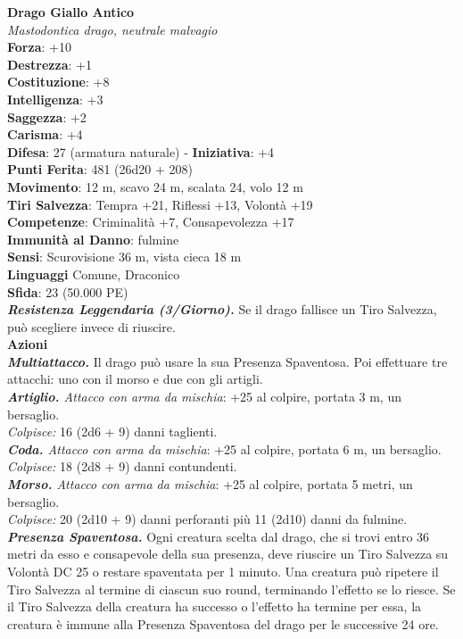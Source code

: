 \begin{multicols}{2}
\medskip\textbf{Drago Giallo Antico}\\
\emph{Mastodontica drago, neutrale malvagio}\\
\textbf{Forza}: +10\\
\textbf{Destrezza}: +1\\
\textbf{Costituzione}: +8\\
\textbf{Intelligenza}: +3\\
\textbf{Saggezza}: +2\\
\textbf{Carisma}: +4\\	
\textbf{Difesa}: 27 (armatura naturale) - \textbf{Iniziativa}: +4\\
\textbf{Punti Ferita}: 481 (26d20 + 208)\\
\textbf{Movimento}: 12 m, scavo 24 m, scalata 24, volo 12 m\\
\textbf{Tiri Salvezza}: Tempra +21, Riflessi +13, Volontà +19\\
\textbf{Competenze}: Criminalità +7, Consapevolezza +17\\
\textbf{Immunità al Danno}: fulmine\\
\textbf{Sensi}: Scurovisione 36 m, vista cieca 18 m\\
\textbf{Linguaggi} Comune, Draconico\\
\textbf{Sfida}: 23 (50.000 PE)\smallskip\\
\emph{\textbf{Resistenza Leggendaria (3/Giorno).}} Se il drago fallisce un Tiro Salvezza, può scegliere invece di riuscire. \\
\smallskip\textbf{Azioni}\\
\emph{\textbf{Multiattacco.}} Il drago può usare la sua Presenza Spaventosa. Poi effettuare tre attacchi: uno con il morso e due con gli artigli.\\
\emph{\textbf{Artiglio.} Attacco con arma da mischia}: +25 al colpire, portata 3 m, un bersaglio.\\
\emph{Colpisce:} 16 (2d6 + 9) danni taglienti.\\
\emph{\textbf{Coda.} Attacco con arma da mischia}: +25 al colpire, portata 6 m, un bersaglio.\\
\emph{Colpisce:} 18 (2d8 + 9) danni contundenti.\\
\emph{\textbf{Morso.} Attacco con arma da mischia}: +25 al colpire, portata 5 metri, un bersaglio.\\
\emph{Colpisce:} 20 (2d10 + 9) danni perforanti più 11 (2d10) danni da fulmine.\\
\emph{\textbf{Presenza Spaventosa.}} Ogni creatura scelta dal drago, che si trovi entro 36 metri da esso e consapevole della sua presenza, deve riuscire un Tiro Salvezza su Volontà DC  25 o restare spaventata per 1 minuto. Una creatura può ripetere il Tiro Salvezza al termine di ciascun suo round, terminando l'effetto se lo riesce. Se il Tiro Salvezza della creatura ha successo o l'effetto ha termine per essa, la creatura è immune alla Presenza Spaventosa del drago per le successive 24 ore.\\

\end{multicols}
